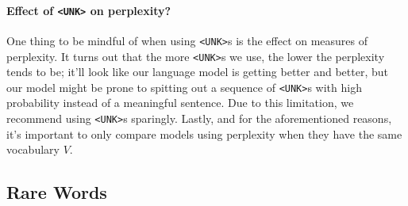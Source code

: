 \documentclass[12pt]{article}
\begin{document}
\paragraph{Effect of \texttt{<UNK>} on perplexity?} One thing to be mindful of when using \texttt{<UNK>}s is the effect on measures of perplexity. It turns out that the more \texttt{<UNK>}s we use, the lower the perplexity tends to be; it'll look like our language model is getting better and better, but our model might be prone to spitting out a sequence of \texttt{<UNK>}s with high probability instead of a meaningful sentence. Due to this limitation, we recommend using \texttt{<UNK>}s sparingly. Lastly, and for the aforementioned reasons, it's important to only compare models using perplexity when they have the same vocabulary $V$.

\subsection{Rare Words}
\end{document}
